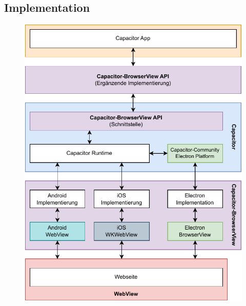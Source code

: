 \subsection{Implementation}

\begin{figure}[H]
    \centering
    \includegraphics[width=\textwidth]{assets/03_Capacitor-BrowserView/03_Aufbau.drawio.pdf}
\end{figure}


\clearpage

